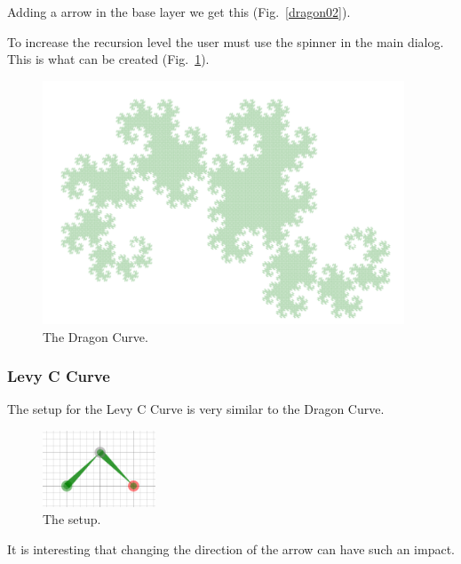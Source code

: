             Adding a arrow in the base layer we get this (Fig.~\ref{dragon02}).

            To increase the recursion level the user must use the spinner in the main dialog.
            This is what can be created (Fig.~\ref{dragon03}).

            \begin{figure}[ht]
                \caption{\label{dragon03} The Dragon Curve.}
                \centering
                \includegraphics[width=0.96\textwidth]{img/dragon03.png}
            \end{figure}

            \FloatBarrier

        \subsubsection{Levy C Curve}

            The setup for the Levy C Curve is very similar to the Dragon Curve.
            
            \begin{figure}[ht]
                \caption{\label{levyc01} The setup.}
                \centering
                \includegraphics[width=0.3\textwidth]{img/levyc01.png}
            \end{figure}

            It is interesting that changing the direction of the arrow can have such an impact.

